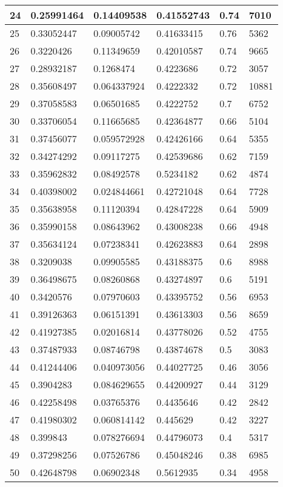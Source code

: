 \begin{longtable}{|l|l|l|l|l|l|}
24 & 0.25991464 & 0.14409538 & 0.41552743 & 0.74 & 7010 \\ \hline 
25 & 0.33052447 & 0.09005742 & 0.41633415 & 0.76 & 5362 \\ \hline 
26 & 0.3220426 & 0.11349659 & 0.42010587 & 0.74 & 9665 \\ \hline 
27 & 0.28932187 & 0.1268474 & 0.4223686 & 0.72 & 3057 \\ \hline 
28 & 0.35608497 & 0.064337924 & 0.4222332 & 0.72 & 10881 \\ \hline 
29 & 0.37058583 & 0.06501685 & 0.4222752 & 0.7 & 6752 \\ \hline 
30 & 0.33706054 & 0.11665685 & 0.42364877 & 0.66 & 5104 \\ \hline 
31 & 0.37456077 & 0.059572928 & 0.42426166 & 0.64 & 5355 \\ \hline 
32 & 0.34274292 & 0.09117275 & 0.42539686 & 0.62 & 7159 \\ \hline 
33 & 0.35962832 & 0.08492578 & 0.5234182 & 0.62 & 4874 \\ \hline 
34 & 0.40398002 & 0.024844661 & 0.42721048 & 0.64 & 7728 \\ \hline 
35 & 0.35638958 & 0.11120394 & 0.42847228 & 0.64 & 5909 \\ \hline 
36 & 0.35990158 & 0.08643962 & 0.43008238 & 0.66 & 4948 \\ \hline 
37 & 0.35634124 & 0.07238341 & 0.42623883 & 0.64 & 2898 \\ \hline 
38 & 0.3209038 & 0.09905585 & 0.43188375 & 0.6 & 8988 \\ \hline 
39 & 0.36498675 & 0.08260868 & 0.43274897 & 0.6 & 5191 \\ \hline 
40 & 0.3420576 & 0.07970603 & 0.43395752 & 0.56 & 6953 \\ \hline 
41 & 0.39126363 & 0.06151391 & 0.43613303 & 0.56 & 8659 \\ \hline 
42 & 0.41927385 & 0.02016814 & 0.43778026 & 0.52 & 4755 \\ \hline 
43 & 0.37487933 & 0.08746798 & 0.43874678 & 0.5 & 3083 \\ \hline 
44 & 0.41244406 & 0.040973056 & 0.44027725 & 0.46 & 3056 \\ \hline 
45 & 0.3904283 & 0.084629655 & 0.44200927 & 0.44 & 3129 \\ \hline 
46 & 0.42258498 & 0.03765376 & 0.4435646 & 0.42 & 2842 \\ \hline 
47 & 0.41980302 & 0.060814142 & 0.445629 & 0.42 & 3227 \\ \hline 
48 & 0.399843 & 0.078276694 & 0.44796073 & 0.4 & 5317 \\ \hline 
49 & 0.37298256 & 0.07526786 & 0.45048246 & 0.38 & 6985 \\ \hline 
50 & 0.42648798 & 0.06902348 & 0.5612935 & 0.34 & 4958 \\ \hline 
\end{longtable}